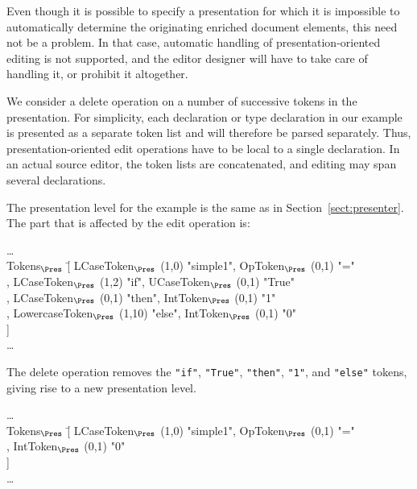 \bc
Even though it is possible to specify a presentation for which it is impossible to automatically determine the originating enriched document elements, this need not be a problem. In that case, automatic handling of presentation-oriented editing is not supported, and the editor designer will have to take care of handling it, or prohibit it altogether. \ec

We consider a delete operation on a number of successive tokens in the presentation. For simplicity, each declaration or type declaration in our example is presented as a separate token list and will therefore be parsed separately. Thus, presentation-oriented edit operations have to be local to a single declaration. In an actual source editor, the token lists are concatenated, and editing may span several declarations.

The presentation level for the example is the same as in Section~\ref{sect:presenter}. The part that is affected by the edit operation is: 

\small \ttfamily
\begin{tabbing}
\dots\\
Tokens$_{\Pres}$ \= [ LCaseToken$_{\Pres}$ (1,0) "simple1", OpToken$_{\Pres}$ (0,1) "="\\
                         \> , LCaseToken$_{\Pres}$ (1,2) "if", UCaseToken$_{\Pres}$ (0,1) "True"\\
                         \> , LCaseToken$_{\Pres}$ (0,1) "then", IntToken$_{\Pres}$ (0,1) "1"\\
                         \> , LowercaseToken$_{\Pres}$ (1,10) "else", IntToken$_{\Pres}$ (0,1) "0"\\
                         \> ]\\
\dots                                                  
\end{tabbing}
\rmfamily \normalsize

The delete operation removes the \verb|"if"|,  \verb|"True"|,  \verb|"then"|,  \verb|"1"|, and  \verb|"else"| tokens, giving rise to a new presentation level.

\small \ttfamily
\begin{tabbing}
\dots\\
Tokens$_{\Pres}$ \= [ LCaseToken$_{\Pres}$ (1,0) "simple1", OpToken$_{\Pres}$ (0,1) "="\\
                         \> ,  IntToken$_{\Pres}$ (0,1) "0"\\
                         \> ]\\
\dots                                                  
\end{tabbing}
\rmfamily \normalsize

